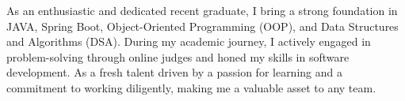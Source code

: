 \documentclass[a4paper,12pt]{article}
\begin{document}


As an enthusiastic and dedicated recent graduate, I bring a strong foundation in JAVA, Spring Boot, Object-Oriented Programming (OOP), and Data Structures and Algorithms (DSA). During my academic journey, I actively engaged in problem-solving through online judges and honed my skills in software development. As a fresh talent driven by a passion for learning and a commitment to working diligently, making me a valuable asset to any team.
\end{document}
